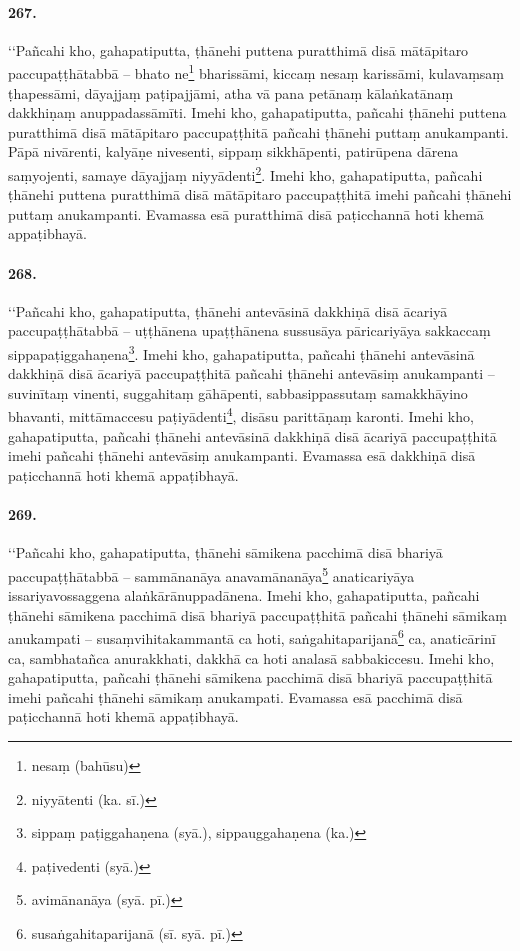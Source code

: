 \paragraph{267.} ‘‘Pañcahi kho, gahapatiputta, ṭhānehi puttena puratthimā disā mātāpitaro paccupaṭṭhātabbā – bhato ne\footnote{nesaṃ (bahūsu)} bharissāmi, kiccaṃ nesaṃ karissāmi, kulavaṃsaṃ ṭhapessāmi, dāyajjaṃ paṭipajjāmi, atha vā pana petānaṃ kālaṅkatānaṃ dakkhiṇaṃ anuppadassāmīti. Imehi kho, gahapatiputta, pañcahi ṭhānehi puttena puratthimā disā mātāpitaro paccupaṭṭhitā pañcahi ṭhānehi puttaṃ anukampanti. Pāpā nivārenti, kalyāṇe nivesenti, sippaṃ sikkhāpenti, patirūpena dārena saṃyojenti, samaye dāyajjaṃ niyyādenti\footnote{niyyātenti (ka. sī.)}. Imehi kho, gahapatiputta, pañcahi ṭhānehi puttena puratthimā disā mātāpitaro paccupaṭṭhitā imehi pañcahi ṭhānehi puttaṃ anukampanti. Evamassa esā puratthimā disā paṭicchannā hoti khemā appaṭibhayā.

\paragraph{268.} ‘‘Pañcahi kho, gahapatiputta, ṭhānehi antevāsinā dakkhiṇā disā ācariyā paccupaṭṭhātabbā – uṭṭhānena upaṭṭhānena sussusāya pāricariyāya sakkaccaṃ sippapaṭiggahaṇena\footnote{sippaṃ paṭiggahaṇena (syā.), sippauggahaṇena (ka.)}. Imehi kho, gahapatiputta, pañcahi ṭhānehi antevāsinā dakkhiṇā disā ācariyā paccupaṭṭhitā pañcahi ṭhānehi antevāsiṃ anukampanti – suvinītaṃ vinenti, suggahitaṃ gāhāpenti, sabbasippassutaṃ samakkhāyino bhavanti, mittāmaccesu paṭiyādenti\footnote{paṭivedenti (syā.)}, disāsu parittāṇaṃ karonti. Imehi kho, gahapatiputta, pañcahi ṭhānehi antevāsinā dakkhiṇā disā ācariyā paccupaṭṭhitā imehi pañcahi ṭhānehi antevāsiṃ anukampanti. Evamassa esā dakkhiṇā disā paṭicchannā hoti khemā appaṭibhayā.

\paragraph{269.} ‘‘Pañcahi kho, gahapatiputta, ṭhānehi sāmikena pacchimā disā bhariyā paccupaṭṭhātabbā – sammānanāya anavamānanāya\footnote{avimānanāya (syā. pī.)} anaticariyāya issariyavossaggena alaṅkārānuppadānena. Imehi kho, gahapatiputta, pañcahi ṭhānehi sāmikena pacchimā disā bhariyā paccupaṭṭhitā pañcahi ṭhānehi sāmikaṃ anukampati – susaṃvihitakammantā ca hoti, saṅgahitaparijanā\footnote{susaṅgahitaparijanā (sī. syā. pī.)} ca, anaticārinī ca, sambhatañca anurakkhati, dakkhā ca hoti analasā sabbakiccesu. Imehi kho, gahapatiputta, pañcahi ṭhānehi sāmikena pacchimā disā bhariyā paccupaṭṭhitā imehi pañcahi ṭhānehi sāmikaṃ anukampati. Evamassa esā pacchimā disā paṭicchannā hoti khemā appaṭibhayā.


